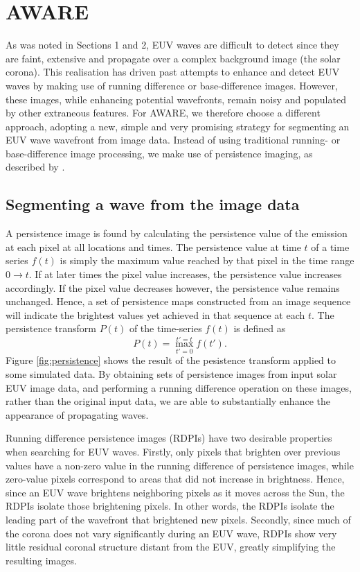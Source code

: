 \section{AWARE}\label{sec:aware}

As was noted in Sections 1 and 2, EUV waves are difficult to detect
since they are faint, extensive and propagate over a complex
background image (the solar corona). This realisation has driven past
attempts to enhance and detect EUV waves by making use of running
difference or base-difference images. However, these images, while
enhancing potential wavefronts, remain noisy and populated by other
extraneous features. For AWARE, we therefore choose a different
approach, adopting a new, simple and very promising strategy for
segmenting an EUV wave wavefront from image data. Instead of using
traditional running- or base-difference image processing, we make use
of persistence imaging, as described by \citet{2014AAS...22421838T}.

\subsection{Segmenting a wave from the image data}\label{sec:aware:segment}

A persistence image is found by calculating the persistence value of
the emission at each pixel at all locations and times.  The
persistence value at time $t$ of a time series $f(t)$ is simply the
maximum value reached by that pixel in the time range $0\rightarrow
t$.  If at later times the pixel value increases, the persistence
value increases accordingly. If the pixel value decreases however, the
persistence value remains unchanged. Hence, a set of persistence maps
constructed from an image sequence will indicate the brightest values
yet achieved in that sequence at each $t$.  The persistence transform
$P(t)$ of the time-series $f(t)$ is defined as
\begin{equation}
\label{eqn:persisttransform}
P(t) = \max_{t'=0}^{t'=t}f(t').
\end{equation}
Figure \ref{fig:persistence} shows the result of the pesistence
transform applied to some simulated data.  By obtaining sets of
persistence images from input solar EUV image data, and performing a
running difference operation on these images, rather than the original
input data, we are able to substantially enhance the appearance of
propagating waves.

Running difference persistence images (RDPIs) have two desirable
properties when searching for EUV waves.  Firstly, only pixels that
brighten over previous values have a non-zero value in the running
difference of persistence images, while zero-value pixels correspond
to areas that did not increase in brightness. Hence, since an EUV wave
brightens neighboring pixels as it moves across the Sun, the RDPIs
isolate those brightening pixels.  In other words, the RDPIs isolate
the leading part of the wavefront that brightened new pixels.
Secondly, since much of the corona does not vary significantly during
an EUV wave, RDPIs show very little residual coronal structure distant
from the EUV, greatly simplifying the resulting images.

